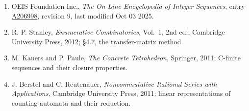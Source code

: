 \documentclass[11pt]{article}
\theoremstyle{definition}
\begin{document}
\begin{enumerate}

\item OEIS Foundation Inc., \emph{The On-Line Encyclopedia of Integer Sequences}, entry \href{https://oeis.org/A206998}{A206998}, revision 9, last modified Oct 03 2025.

\item R. P. Stanley, \emph{Enumerative Combinatorics}, Vol.~1, 2nd ed., Cambridge University Press, 2012; \S4.7, the transfer-matrix method.

\item M. Kauers and P. Paule, \emph{The Concrete Tetrahedron}, Springer, 2011; C-finite sequences and their closure properties.

\item J. Berstel and C. Reutenauer, \emph{Noncommutative Rational Series with Applications}, Cambridge University Press, 2011; linear representations of counting automata and their reduction.

\end{enumerate}
\end{document}
